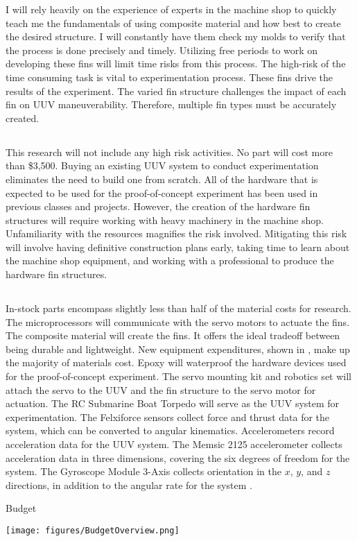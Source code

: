 \documentclass[]{IEEEtran}
\begin{document}
I will rely heavily on the experience of experts in the machine shop to quickly teach me the fundamentals of using composite material and how best to create the desired structure.  I will constantly have them check my molds to verify that the process is done precisely and timely.  Utilizing free periods to work on developing these fins will limit time risks from this process.  The high-risk of the time consuming task is vital to experimentation process.  These fins drive the results of the experiment.  The varied fin structure challenges the impact of each fin on UUV maneuverability.  Therefore, multiple fin types must be accurately created.

\subsection{}
This research will not include any high risk activities.  No part will cost more than \$3,500.  Buying an existing UUV system to conduct experimentation eliminates the need to build one from scratch.  All of the hardware that is expected to be used for the proof-of-concept experiment has been used in previous classes and projects.  However, the creation of the hardware fin structures will require working with heavy machinery in the machine shop.  Unfamiliarity with the resources magnifies the risk involved.  Mitigating this risk will involve having definitive construction plans early, taking time to learn about the machine shop equipment, and working with a professional to produce the hardware fin structures.  

\subsection{}
In-stock parts encompass slightly less than half of the material costs for research.  The microprocessors will communicate with the servo motors to actuate the fins.  The composite material will create the fins.  It offers the ideal tradeoff between being durable and lightweight.  New equipment expenditures, shown in , make up the majority of materials cost.  Epoxy will waterproof the hardware devices used for the proof-of-concept experiment.  The servo mounting kit and robotics set will attach the servo to the UUV and the fin structure to the servo motor for actuation.  The RC Submarine Boat Torpedo will serve as the UUV system for experimentation.  The Felxiforce sensors collect force and thrust data for the system, which can be converted to angular kinematics.  Accelerometers record acceleration data for the UUV system.  The Memsic 2125 accelerometer collects acceleration data in three dimensions, covering the six degrees of freedom for the system.  The Gyroscope Module 3-Axis collects orientation in the $x$, $y$, and $z$ directions, in addition to the angular rate for the system \cite{parallax2013}.    
\begin{table*}[p]
\caption{Budget}
\label{tab:2}
\begin{center}
\texttt{[image: figures/BudgetOverview.png]}
\end{center}
\end{table*}
\end{document}
